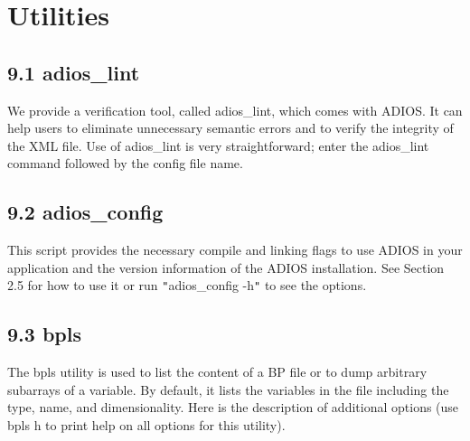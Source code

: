 \vspace{34pt}
\section{Utilities}

\vspace{24pt}
\subsection*{{\large 9.1 }{\large \textbf{ \label{HToc84890279}\label{HToc212016655}\label{HToc212016897}\label{HToc182553426}adios\_lint}}}

\vspace{10pt}
We provide a verification tool, called adios\_lint, which comes with ADIOS. It 
can help users to eliminate unnecessary semantic errors and to verify the integrity 
of the XML file. Use of adios\_lint is very straightforward; enter the adios\_lint 
command followed by the config file name.\label{HToc82067529}\label{HToc84890280}\label{HToc212016656}\label{HToc212016898}\label{HToc182553427}

\vspace{10pt}
\subsection*{{\large 9.2 }{\large \textbf{adios\_config}}}

\vspace{10pt}
This script provides the necessary compile and linking flags to use ADIOS in your 
application and the version information of the ADIOS installation.  See Section 
2.5 for how to use it or run \texttt{"}adios\_config -h\texttt{"} to see the options. 
\label{HToc182553428}

\vspace{10pt}
\subsection*{{\large 9.3 }{\large \textbf{bpls}}}

\vspace{10pt}
The bpls utility is used to list the content of a BP file or to dump arbitrary 
subarrays of a variable. By default, it lists the variables in the file including 
the type, name, and dimensionality. Here is the description of additional options 
(use bpls \-{}h to print help on all options for this utility).

